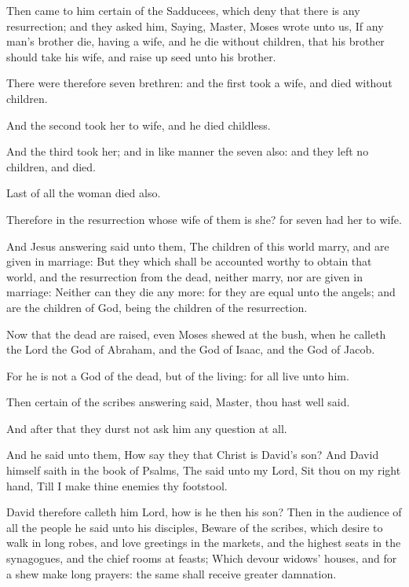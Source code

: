 \Verse Then came to him certain of the Sadducees, which deny that there is any resurrection; and they asked him, \Verse Saying, Master, Moses wrote unto us, If any man's brother die, having a wife, and he die without children, that his brother should take his wife, and raise up seed unto his brother.

\Verse There were therefore seven brethren: and the first took a wife, and died without children.

\Verse And the second took her to wife, and he died childless.

\Verse And the third took her; and in like manner the seven also: and they left no children, and died.

\Verse Last of all the woman died also.

\Verse Therefore in the resurrection whose wife of them is she? for seven had her to wife.

\Verse And Jesus answering said unto them, The children of this world marry, and are given in marriage: \Verse But they which shall be accounted worthy to obtain that world, and the resurrection from the dead, neither marry, nor are given in marriage: \Verse Neither can they die any more: for they are equal unto the angels; and are the children of God, being the children of the resurrection.

\Verse Now that the dead are raised, even Moses shewed at the bush, when he calleth the Lord the God of Abraham, and the God of Isaac, and the God of Jacob.

\Verse For he is not a God of the dead, but of the living: for all live unto him.

\Verse Then certain of the scribes answering said, Master, thou hast well said.

\Verse And after that they durst not ask him any question at all.

\Verse And he said unto them, How say they that Christ is David's son?  \Verse And David himself saith in the book of Psalms, The \LORD said unto my Lord, Sit thou on my right hand, \Verse Till I make thine enemies thy footstool.

\Verse David therefore calleth him Lord, how is he then his son?  \Verse Then in the audience of all the people he said unto his disciples, \Verse Beware of the scribes, which desire to walk in long robes, and love greetings in the markets, and the highest seats in the synagogues, and the chief rooms at feasts; \Verse Which devour widows' houses, and for a shew make long prayers: the same shall receive greater damnation.


